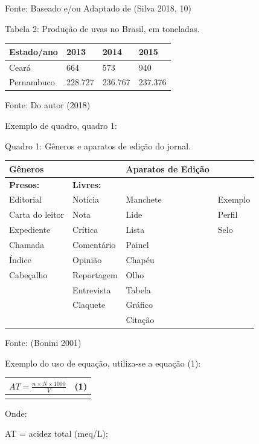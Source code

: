 \documentclass[
]{article}
\begin{document}
Fonte: Baseado e/ou Adaptado de (Silva 2018, 10)

Tabela 2: Produção de uvas no Brasil, em toneladas.

\begin{longtable}[]{@{}llll@{}}
\toprule\noalign{}
\textbf{Estado/ano} & \textbf{2013} & \textbf{2014} & \textbf{2015} \\
\midrule\noalign{}
\endhead
\bottomrule\noalign{}
\endlastfoot
Ceará & 664 & 573 & 940 \\
Pernambuco & 228.727 & 236.767 & 237.376 \\
\end{longtable}

Fonte: Do autor (2018)

Exemplo de quadro, quadro 1:

Quadro 1: Gêneros e aparatos de edição do jornal.

\begin{longtable}[]{@{}llll@{}}
\toprule\noalign{}
\textbf{Gêneros} & & \textbf{Aparatos de Edição} & \\
\midrule\noalign{}
\endhead
\bottomrule\noalign{}
\endlastfoot
\textbf{Presos:} & \textbf{Livres:} & & \\
Editorial & Notícia & Manchete & Exemplo \\
Carta do leitor & Nota & Lide & Perfil \\
Expediente & Crítica & Lista & Selo \\
Chamada & Comentário & Painel & \\
Índice & Opinião & Chapéu & \\
Cabeçalho & Reportagem & Olho & \\
& Entrevista & Tabela & \\
& Claquete & Gráfico & \\
& & Citação & \\
\end{longtable}

Fonte: (Bonini 2001)

Exemplo do uso de equação, utiliza-se a equação (1):

\begin{longtable}[]{@{}ll@{}}
\toprule\noalign{}
\(AT = \frac{n \times N \times 1000}{V}\) & (1) \\
\midrule\noalign{}
\endhead
\bottomrule\noalign{}
\endlastfoot
\end{longtable}

Onde:

AT = acidez total (meq/L);
\end{document}
